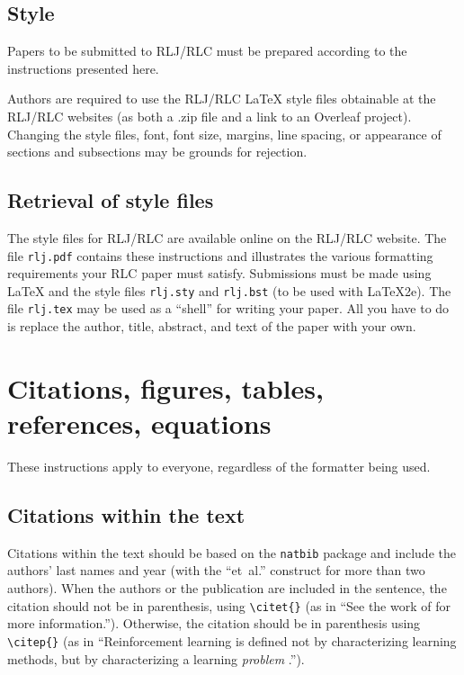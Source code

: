 \documentclass[10pt]{article} %
\theoremstyle{plain}
\theoremstyle{definition}
\theoremstyle{remark}
\begin{document}
\subsection{Style}
Papers to be submitted to RLJ/RLC must be prepared according to the instructions presented here.

Authors are required to use the RLJ/RLC \LaTeX{} style files obtainable at the RLJ/RLC websites (as both a .zip file and a link to an Overleaf project). 
Changing the style files, font, font size, margins, line spacing, or appearance of sections and subsections may be grounds for rejection.

\subsection{Retrieval of style files}

The style files for RLJ/RLC are available online on the RLJ/RLC website. The file \verb+rlj.pdf+ contains these instructions and illustrates the various formatting requirements your RLC paper must satisfy. Submissions must be made using \LaTeX{} and the style files \verb+rlj.sty+ and \verb+rlj.bst+ (to be used with \LaTeX{}2e). The file \verb+rlj.tex+ may be used as a ``shell'' for writing your paper. All you have to do is replace the author, title, abstract, and text of the paper with your own.

\section{Citations, figures, tables, references, equations}
\label{sec:others}

These instructions apply to everyone, regardless of the formatter being used.

\subsection{Citations within the text}
\label{sec:citations}
Citations within the text should be based on the \texttt{natbib} package and include the authors' last names and year (with the ``et~al.'' construct for more than two authors). When the authors or the publication are included in the sentence, the citation should not be in parenthesis, using \verb|\citet{}| (as in ``See the work of \citet{sutton1998introduction} for more information.''). Otherwise, the citation should be in parenthesis using \verb|\citep{}| (as in ``Reinforcement learning is defined not by characterizing learning methods, but by characterizing a learning \textit{problem} \citep{sutton1998introduction}.'').
\end{document}
